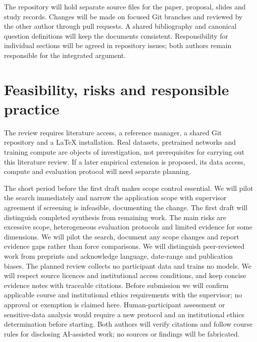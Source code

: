 The repository will hold separate source files for the paper, proposal,
slides and study records. Changes will be made on focused Git branches and
reviewed by the other author through pull requests. A shared bibliography
and canonical question definitions will keep the documents consistent.
Responsibility for individual sections will be agreed in repository issues;
both authors remain responsible for the integrated argument.

\section{Feasibility, risks and responsible practice}
The review requires literature access, a reference manager, a shared Git
repository and a LaTeX installation. Real datasets, pretrained networks and
training compute are objects of investigation, not prerequisites for carrying
out this literature review. If a later empirical extension is proposed, its
data access, compute and evaluation protocol will need separate planning.

The short period before the first draft makes scope control essential.
We will pilot the search immediately and narrow the application scope with
supervisor agreement if screening is infeasible, documenting the change.
The first draft will distinguish completed synthesis from remaining work.
The main risks are excessive scope, heterogeneous evaluation protocols and
limited evidence for some dimensions. We will pilot the search, document any
scope changes and report evidence gaps rather than force comparisons.
We will distinguish peer-reviewed work from preprints and acknowledge language,
date-range and publication biases. The planned review collects no participant
data and trains no models. We will respect source licences and institutional
access conditions, and keep concise evidence notes with traceable citations.
Before submission we will confirm applicable course and institutional ethics
requirements with the supervisor; no approval or exemption is claimed here.
Human-participant assessment or sensitive-data analysis would require a new
protocol and an institutional ethics determination before starting.
Both authors will verify citations and follow course rules for disclosing
AI-assisted work; no sources or findings will be fabricated.
